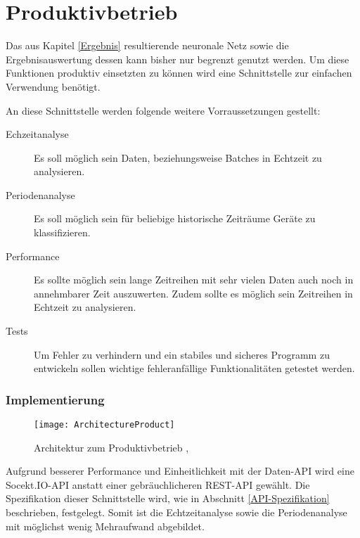 \chapter{Produktivbetrieb}
    Das aus Kapitel \ref{Ergebnis} resultierende neuronale Netz sowie die Ergebnisauswertung dessen kann bisher nur begrenzt genutzt werden.
    Um diese Funktionen produktiv einsetzten zu können wird eine Schnittstelle zur einfachen Verwendung benötigt.
    
    An diese Schnittstelle werden folgende weitere Vorraussetzungen gestellt:
    \begin{description}
        \item[Echzeitanalyse] Es soll möglich sein Daten, beziehungsweise Batches in Echtzeit zu analysieren.
        \item[Periodenanalyse] Es soll möglich sein für beliebige historische Zeiträume Geräte zu klassifizieren.
        \item[Performance] Es sollte möglich sein lange Zeitreihen mit sehr vielen Daten auch noch in annehmbarer Zeit auszuwerten. Zudem sollte es möglich sein Zeitreihen in Echtzeit zu analysieren.
        \item[Tests] Um Fehler zu verhindern und ein stabiles und sicheres Programm zu entwickeln sollen wichtige fehleranfällige Funktionalitäten getestet werden.
    \end{description}
    
    \subsection{Implementierung}

        \begin{figure}[h]
            \centering
            \texttt{[image: ArchitectureProduct]}
            \caption{Architektur zum Produktivbetrieb \protect\cite{DrawIO}, \protect\cite{Tensorflow}}
            \label{fig:ArchitectureTraining}
        \end{figure}

        Aufgrund besserer Performance und Einheitlichkeit mit der Daten-API wird eine Socekt.IO-API anstatt einer gebräuchlicheren REST-API gewählt.
        Die Spezifikation dieser Schnittstelle wird, wie in Abschnitt \ref{API-Spezifikation} beschrieben, festgelegt. 
        Somit ist die Echtzeitanalyse sowie die Periodenanalyse mit möglichst wenig Mehraufwand abgebildet.
        \newline

